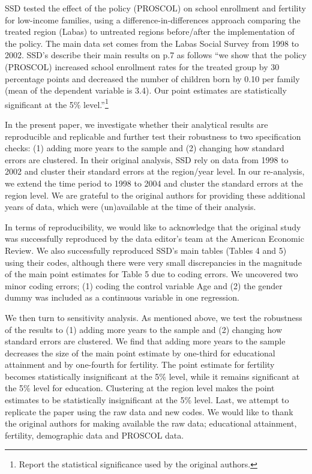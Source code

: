 \documentclass[12pt,a4paper]{article}
\begin{document}
SSD tested the effect of the policy (PROSCOL) on school enrollment and fertility for low-income families, using a difference-in-differences approach comparing the treated region (Labas) to untreated regions before/after the implementation of the policy. The main data set comes from the Labas Social Survey from 1998 to 2002. SSD’s describe their main results on p.7 as follows “we show that the policy (PROSCOL) increased school enrollment rates for the treated group by 30 percentage points and decreased the number of children born by 0.10 per family (mean of the dependent variable is 3.4). Our point estimates are statistically significant at the 5\% level.”\footnote{Report the statistical significance used by the original authors.}

In the present paper, we investigate whether their analytical results are reproducible and replicable and further test their robustness to two specification checks: (1) adding more years to the sample and (2) changing how standard errors are clustered. In their original analysis, SSD rely on data from 1998 to 2002 and cluster their standard errors at the region/year level. In our re-analysis, we extend the time period to 1998 to 2004 and cluster the standard errors at the region level. We are grateful to the original authors for providing these additional years of data, which were (un)available at the time of their analysis.

In terms of reproducibility, we would like to acknowledge that the original study was successfully reproduced by the data editor’s team at the American Economic Review. We also successfully reproduced SSD’s main tables (Tables 4 and 5) using their codes, although there were very small discrepancies in the magnitude of the main point estimates for Table 5 due to coding errors. We uncovered two minor coding errors; (1) coding the control variable Age and (2) the gender dummy was included as a continuous variable in one regression.

We then turn to sensitivity analysis. As mentioned above, we test the robustness of the results to (1) adding more years to the sample and (2) changing how standard errors are clustered. We find that adding more years to the sample decreases the size of the main point estimate by one-third for educational attainment and by one-fourth for fertility. The point estimate for fertility becomes statistically insignificant at the 5\% level, while it remains significant at the 5\% level for education. Clustering at the region level makes the point estimates to be statistically insignificant at the 5\% level.
Last, we attempt to replicate the paper using the raw data and new codes. We would like to thank the original authors for making available the raw data; educational attainment, fertility, demographic data and PROSCOL data.
\end{document}
